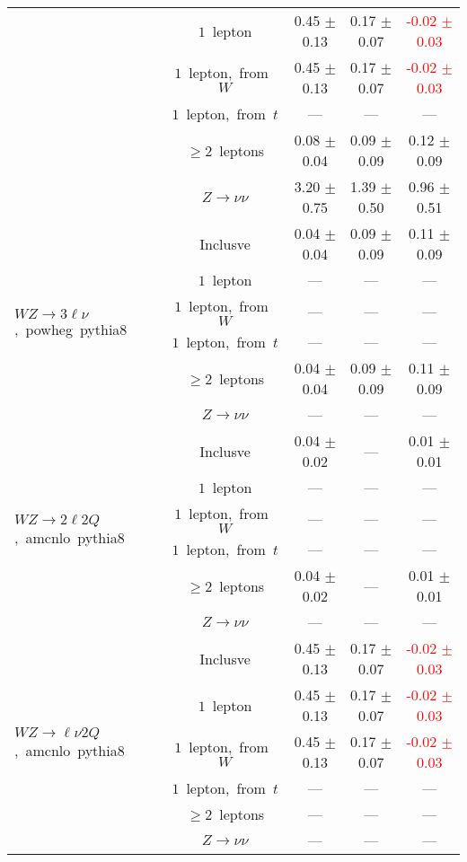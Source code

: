 \documentclass{article}
\begin{document}
\begin{longtable}{|l|c|c|c|c|}
 & $1$~lepton  & 0.45 $\pm$ 0.13  & 0.17 $\pm$ 0.07  & \textcolor{red}{ -0.02 $\pm$ 0.03 } \\* 
 & $1$~lepton,~from~$W$  & 0.45 $\pm$ 0.13  & 0.17 $\pm$ 0.07  & \textcolor{red}{ -0.02 $\pm$ 0.03 } \\* 
 & $1$~lepton,~from~$t$  & ---  & ---  & --- \\* 
 & $\ge2$~leptons  & 0.08 $\pm$ 0.04  & 0.09 $\pm$ 0.09  & 0.12 $\pm$ 0.09 \\* 
 & $Z\rightarrow\nu\nu$  & 3.20 $\pm$ 0.75  & 1.39 $\pm$ 0.50  & 0.96 $\pm$ 0.51 \\* 
\hline 
\multirow{6}{*}{$WZ{\rightarrow}3\ell\nu$,~powheg~pythia8} & Inclusve  & 0.04 $\pm$ 0.04  & 0.09 $\pm$ 0.09  & 0.11 $\pm$ 0.09 \\* 
 & $1$~lepton  & ---  & ---  & --- \\* 
 & $1$~lepton,~from~$W$  & ---  & ---  & --- \\* 
 & $1$~lepton,~from~$t$  & ---  & ---  & --- \\* 
 & $\ge2$~leptons  & 0.04 $\pm$ 0.04  & 0.09 $\pm$ 0.09  & 0.11 $\pm$ 0.09 \\* 
 & $Z\rightarrow\nu\nu$  & ---  & ---  & --- \\* 
\hline 
\multirow{6}{*}{$WZ{\rightarrow}2{\ell}2Q$,~amcnlo~pythia8} & Inclusve  & 0.04 $\pm$ 0.02  & ---  & 0.01 $\pm$ 0.01 \\* 
 & $1$~lepton  & ---  & ---  & --- \\* 
 & $1$~lepton,~from~$W$  & ---  & ---  & --- \\* 
 & $1$~lepton,~from~$t$  & ---  & ---  & --- \\* 
 & $\ge2$~leptons  & 0.04 $\pm$ 0.02  & ---  & 0.01 $\pm$ 0.01 \\* 
 & $Z\rightarrow\nu\nu$  & ---  & ---  & --- \\* 
\hline 
\multirow{6}{*}{$WZ{\rightarrow}{\ell}{\nu}2Q$,~amcnlo~pythia8} & Inclusve  & 0.45 $\pm$ 0.13  & 0.17 $\pm$ 0.07  & \textcolor{red}{ -0.02 $\pm$ 0.03 } \\* 
 & $1$~lepton  & 0.45 $\pm$ 0.13  & 0.17 $\pm$ 0.07  & \textcolor{red}{ -0.02 $\pm$ 0.03 } \\* 
 & $1$~lepton,~from~$W$  & 0.45 $\pm$ 0.13  & 0.17 $\pm$ 0.07  & \textcolor{red}{ -0.02 $\pm$ 0.03 } \\* 
 & $1$~lepton,~from~$t$  & ---  & ---  & --- \\* 
 & $\ge2$~leptons  & ---  & ---  & --- \\* 
 & $Z\rightarrow\nu\nu$  & ---  & ---  & --- \\* 

\end{longtable}
\end{document}
